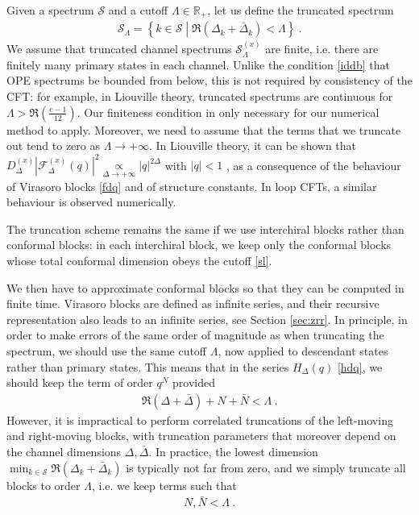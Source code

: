 \documentclass[12pt, a4paper]{article}
\theoremstyle{break}
\begin{document}
Given a spectrum $\mathcal{S}$ and a cutoff $\Lambda \in \mathbb{R}_+$, let us define the truncated spectrum  
\begin{align}
 \mathcal{S}_\Lambda = \left\{ k\in \mathcal{S}\middle| \Re\left(\Delta_k+\bar\Delta_k\right)<\Lambda \right\} \ . 
 \label{sl}
\end{align}
We assume that truncated channel spectrums $\mathcal{S}^{(x)}_\Lambda$ are finite, i.e. there are finitely many primary states in each channel. Unlike the condition \eqref{iddb} that OPE spectrums be bounded from below, this is not required by consistency of the CFT: for example, in Liouville theory, truncated spectrums are continuous for $\Lambda>\Re\left(\frac{c-1}{12}\right)$. Our finiteness condition in only necessary for our numerical method to apply. Moreover, we need to assume that the terms that we truncate out tend to zero as $\Lambda\to +\infty$. In Liouville theory, it can be shown that $D^{(x)}_\Delta \left|\mathcal{F}^{(x)}_\Delta(q)\right|^2 \underset{\Delta\to+\infty}{\propto} |q|^{2\Delta}$ with $|q|<1$ \cite{rs15}, as a consequence of the behaviour of Virasoro blocks \eqref{fdq} and of structure constants. In loop CFTs, a similar behaviour is observed numerically.

The truncation scheme remains the same if we use interchiral blocks rather than conformal blocks: in each interchiral block, we keep only the conformal blocks whose total conformal dimension obeys the cutoff \eqref{sl}. 

We then have to approximate conformal blocks so that they can be computed in finite time. Virasoro blocks are defined as infinite series, and their recursive representation also leads to an infinite series, see Section \ref{sec:zrr}. In principle, in order to make errors of the same order of magnitude as when truncating the spectrum, we should use the same cutoff $\Lambda$, now applied to descendant states rather than primary states. This means that in the series $H_\Delta(q)$ \eqref{hdq}, we should keep the term of order $q^N$ provided 
\begin{align}
 \Re\left(\Delta +\bar\Delta\right) + N + \bar N <\Lambda\ . 
\end{align}
However, it is impractical to perform correlated truncations of the left-moving and right-moving blocks, with truncation parameters that moreover depend on the channel dimensions $\Delta,\bar\Delta$. In practice, the lowest dimension $\min_{k\in\mathcal{S}}\Re\left(\Delta_k+\bar\Delta_k\right)$ is typically not far from zero, and we simply truncate all blocks to order $\Lambda$, i.e. we keep terms such that 
\begin{align}
 N,\bar N < \Lambda \ . 
\end{align}
\end{document}
